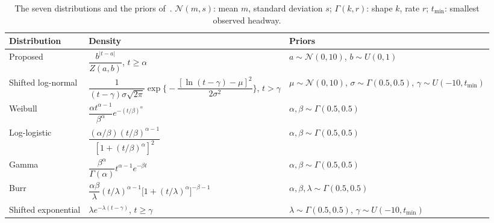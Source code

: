 \documentclass[10pt,a4paper]{article}
\numberwithin{equation}{section}
\begin{document}
\begin{table}[H]
\centering\footnotesize
\caption{The seven distributions and the priors of~\cite{leungbootnak}. $\mathcal N(m,s)$: mean $m$, standard deviation $s$; $\Gamma(k,r)$: shape $k$, rate $r$; $t_{\min}$: smallest observed headway.}
\label{tab:dists}
\begin{tabularx}{\textwidth}{@{}lYY@{}}
\toprule
Distribution & Density & Priors \\
\midrule
Proposed & $\dfrac{b^{|t-a|}}{Z(a,b)}$, $t\ge\alpha$ & $a\sim\mathcal N(0,10)$, $b\sim U(0,1)$ \\[1.2ex]
Shifted log-normal & $\dfrac{1}{(t-\gamma)\sigma\sqrt{2\pi}}\exp\!\Big\{-\dfrac{[\ln(t-\gamma)-\mu]^2}{2\sigma^2}\Big\}$, $t>\gamma$ & $\mu\sim\mathcal N(0,10)$, $\sigma\sim\Gamma(0.5,0.5)$, $\gamma\sim U(-10,t_{\min})$ \\[1.2ex]
Weibull & $\dfrac{\alpha t^{\alpha-1}}{\beta^{\alpha}}e^{-(t/\beta)^{\alpha}}$ & $\alpha,\beta\sim\Gamma(0.5,0.5)$ \\[1.2ex]
Log-logistic & $\dfrac{(\alpha/\beta)(t/\beta)^{\alpha-1}}{[1+(t/\beta)^{\alpha}]^{2}}$ & $\alpha,\beta\sim\Gamma(0.5,0.5)$ \\[1.2ex]
Gamma & $\dfrac{\beta^{\alpha}}{\Gamma(\alpha)}t^{\alpha-1}e^{-\beta t}$ & $\alpha,\beta\sim\Gamma(0.5,0.5)$ \\[1.2ex]
Burr & $\dfrac{\alpha\beta}{\lambda}(t/\lambda)^{\alpha-1}\big[1+(t/\lambda)^{\alpha}\big]^{-\beta-1}$ & $\alpha,\beta,\lambda\sim\Gamma(0.5,0.5)$ \\[1.2ex]
Shifted exponential & $\lambda e^{-\lambda(t-\gamma)}$, $t\ge\gamma$ & $\lambda\sim\Gamma(0.5,0.5)$, $\gamma\sim U(-10,t_{\min})$ \\
\bottomrule
\end{tabularx}
\end{table}
\end{document}
